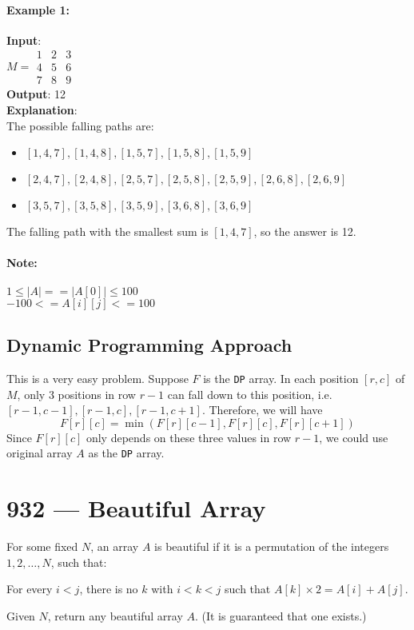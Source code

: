 \paragraph{Example 1:}
\begin{flushleft}
\textbf{Input}:
\\
$M = \begin{array}{ccc}
1 & 2 & 3 \\
4 & 5 & 6 \\
7 & 8 & 9 
\end{array}$
\\
\textbf{Output}: 12
\\
\textbf{Explanation}:
\\
The possible falling paths are:
\begin{itemize}
\item $[1,4,7], [1,4,8], [1,5,7], [1,5,8], [1,5,9]$
\item $[2,4,7], [2,4,8], [2,5,7], [2,5,8], [2,5,9], [2,6,8], [2,6,9]$
\item $[3,5,7], [3,5,8], [3,5,9], [3,6,8], [3,6,9]$
\end{itemize}
The falling path with the smallest sum is $[1,4,7]$, so the answer is 12.
\end{flushleft}
\paragraph{Note:}
\begin{flushleft}
$1 \leq |A| == |A[0]| \leq 100$
\\
$-100 <= A[i][j] <= 100$
\end{flushleft}
\subsection{Dynamic Programming Approach}
This is a very easy problem. Suppose $F$ is the \texttt{DP} array. In each position $[r,c]$ of $M$, only 3 positions in row $r-1$ can fall down to this position, i.e. $[r-1, c-1], [r-1,c], [r-1,c+1]$. Therefore, we will have
\[
F[r][c] = \min(F[r][c-1], F[r][c], F[r][c+1])
\]
Since $F[r][c]$ only depends on these three values in row $r-1$, we could use original array $A$ as the \texttt{DP} array.

\section{932 --- Beautiful Array}
For some fixed $N$, an array $A$ is beautiful if it is a permutation of the integers $1, 2, \ldots, N$, such that:
\par
For every $i < j$, there is no $k$ with $i < k < j$ such that $A[k] \times 2 = A[i] + A[j]$.
\par
Given $N$, return any beautiful array $A$.  (It is guaranteed that one exists.)
